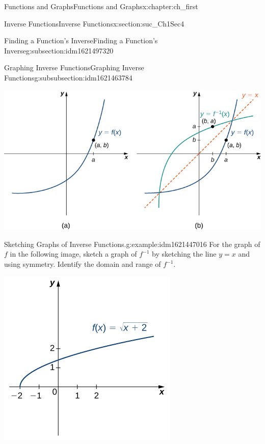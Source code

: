 \documentclass[oneside,10pt,]{book}
\numberwithin{equation}{section}
\begin{document}
\begin{chapterptx}{Functions and Graphs}{}{Functions and Graphs}{}{}{x:chapter:ch_first}
\begin{sectionptx}{Inverse Functions}{}{Inverse Functions}{}{}{x:section:suc_Ch1Sec4}
\begin{subsectionptx}{Finding a Function’s Inverse}{}{Finding a Function’s Inverse}{}{}{g:subsection:idm1621497320}
\begin{subsubsectionptx}{Graphing Inverse Functions}{}{Graphing Inverse Functions}{}{}{g:subsubsection:idm1621463784}
\begin{figureptx}
\begin{image}{0.25}{0.5}{0.25}
\includegraphics[width=\linewidth]{external/CNX_Calc_Figure_01_04_017.jpg}
\end{image}%
\tcblower
\end{figureptx}%
\begin{example}{Sketching Graphs of Inverse Functions.}{g:example:idm1621447016}%
For the graph of \(f\) in the following image, sketch a graph of \(f^{-1} \) by sketching the line \(y=x\) and using symmetry. Identify the domain and range of \(f^{-1} .\)%
\begin{image}{0.25}{0.5}{0.25}%
\includegraphics[width=\linewidth]{external/CNX_Calc_Figure_01_04_009.jpg}
\end{image}%
\par\smallskip%

\end{example}
\end{subsubsectionptx}
\end{subsectionptx}
\end{sectionptx}
\end{chapterptx}
\end{document}
